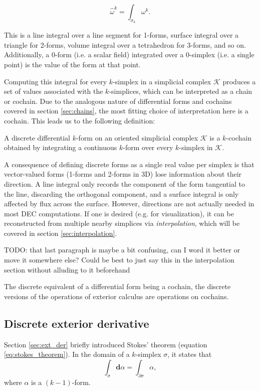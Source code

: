 \documentclass[utf8,english]{gradu3}
\begin{document}
\[
  \widehat{\omega}^k = \int_{\sigma_k} \omega^k.
\]

This is a line integral over a line segment for 1-forms,
surface integral over a triangle for 2-forms,
volume integral over a tetrahedron for 3-forms, and so on.
Additionally, a 0-form (i.e. a scalar field)
integrated over a 0-simplex (i.e. a single point)
is the value of the form at that point.

Computing this integral for every $k$-simplex in a simplicial complex $\mathcal{K}$
produces a set of values associated with the $k$-simplices,
which can be interpreted as a chain or cochain.
Due to the analogous nature of differential forms and cochains
covered in section \ref{sec:chains},
the most fitting choice of interpretation here is a cochain.
This leads us to the following definition:

A discrete differential $k$-form on an oriented simplicial complex $\mathcal{K}$
is a $k$-cochain obtained by integrating a continuous $k$-form
over every $k$-simplex in $\mathcal{K}$.

A consequence of defining discrete forms as a single real value per simplex
is that vector-valued forms (1-forms and 2-forms in 3D)
lose information about their direction.
A line integral only records the component of the form tangential to the line,
discarding the orthogonal component,
and a surface integral is only affected by flux across the surface.
However, directions are not actually needed in most DEC computations.
If one is desired (e.g. for visualization),
it can be reconstructed from multiple nearby simplices via \textit{interpolation},
which will be covered in section \ref{sec:interpolation}.

TODO: that last paragraph is maybe a bit confusing,
can I word it better or move it somewhere else?
Could be best to just say this in the interpolation section
without alluding to it beforehand

The discrete equivalent of a differential form being a cochain,
the discrete versions of the operations of exterior calculus
are operations on cochains.

\subsection{Discrete exterior derivative}\label{sec:disc_ext_der}

Section \ref{sec:ext_der} briefly introduced Stokes' theorem
(equation \ref{eq:stokes_theorem}).
In the domain of a $k$-simplex $\sigma$, it states that
\begin{equation}\label{eq:stokes_simplex}
  \int_{\sigma} \mathbf{d}\alpha = \int_{\partial\sigma} \alpha,
\end{equation}
where $\alpha$ is a $(k-1)$-form.
\end{document}
